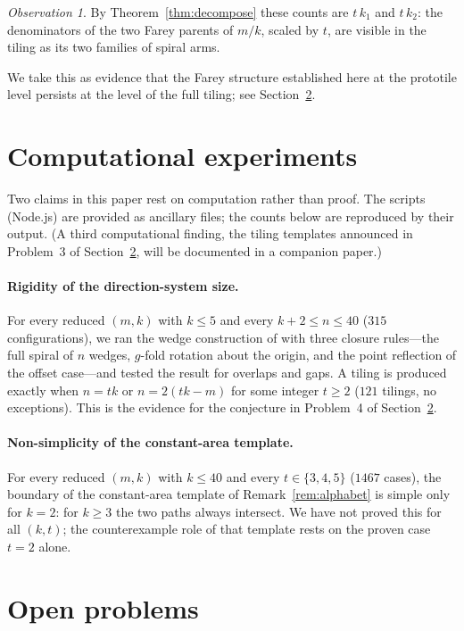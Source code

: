 \documentclass[11pt]{article}
\theoremstyle{remark}
\newtheorem{observation}[theorem]{Observation}
\theoremstyle{definition}
\begin{document}
\begin{observation}\label{obs:arms}
By Theorem~\ref{thm:decompose} these counts are $t\,k_1$ and $t\,k_2$: the denominators
of the two Farey parents of $m/k$, scaled by $t$, are visible in the tiling as its two
families of spiral arms.
\end{observation}

We take this as evidence that the Farey structure established here at the prototile level
persists at the level of the full tiling; see Section~\ref{sec:open}.

\section{Computational experiments}\label{sec:verification}

Two claims in this paper rest on computation rather than proof. The scripts
(Node.js) are provided as ancillary files; the counts below are reproduced by their
output. (A third computational finding, the tiling templates announced in Problem~3
of Section~\ref{sec:open}, will be documented in a companion paper.)

\paragraph{Rigidity of the direction-system size.}
For every reduced $(m,k)$ with $k\le5$ and every $k+2\le n\le 40$ ($315$
configurations), we ran the wedge construction of \cite{Imura2025} with three
closure rules---the full spiral of $n$ wedges, $g$-fold rotation about the origin,
and the point reflection of the offset case---and tested the result for overlaps
and gaps. A tiling is produced exactly when $n=tk$ or $n=2(tk-m)$ for some integer
$t\ge2$ ($121$ tilings, no exceptions). This is the evidence for the conjecture in
Problem~4 of Section~\ref{sec:open}.

\paragraph{Non-simplicity of the constant-area template.}
For every reduced $(m,k)$ with $k\le40$ and every $t\in\{3,4,5\}$ ($1467$ cases),
the boundary of the constant-area template of Remark~\ref{rem:alphabet} is simple
only for $k=2$: for $k\ge3$ the two paths always intersect. We have not proved this
for all $(k,t)$; the counterexample role of that template rests on the proven case
$t=2$ alone.

\section{Open problems}\label{sec:open}
\end{document}
